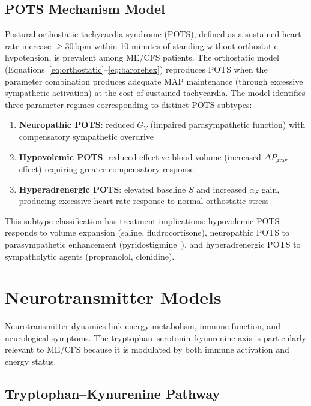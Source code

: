 \subsection{POTS Mechanism Model}
\label{sec:pots-model}

Postural orthostatic tachycardia syndrome (POTS), defined as a sustained heart rate increase $\geq 30$\,bpm within 10 minutes of standing without orthostatic hypotension, is prevalent among ME/CFS patients. The orthostatic model (Equations~\ref{eq:orthostatic}--\ref{eq:baroreflex}) reproduces POTS when the parameter combination produces adequate MAP maintenance (through excessive sympathetic activation) at the cost of sustained tachycardia. The model identifies three parameter regimes corresponding to distinct POTS subtypes:

\begin{enumerate}
    \item \textbf{Neuropathic POTS}: reduced $G_V$ (impaired parasympathetic function) with compensatory sympathetic overdrive
    \item \textbf{Hypovolemic POTS}: reduced effective blood volume (increased $\Delta P_{\text{grav}}$ effect) requiring greater compensatory response
    \item \textbf{Hyperadrenergic POTS}: elevated baseline $S$ and increased $\alpha_S$ gain, producing excessive heart rate response to normal orthostatic stress
\end{enumerate}

This subtype classification has treatment implications: hypovolemic POTS responds to volume expansion (saline, fludrocortisone), neuropathic POTS to parasympathetic enhancement (pyridostigmine~\cite{Raj2005Pyridostigmine}), and hyperadrenergic POTS to sympatholytic agents (propranolol, clonidine).



\section{Neurotransmitter Models}
\label{sec:neurotransmitter-models}

Neurotransmitter dynamics link energy metabolism, immune function, and neurological symptoms. The tryptophan--serotonin--kynurenine axis is particularly relevant to ME/CFS because it is modulated by both immune activation and energy status.

\subsection{Tryptophan--Kynurenine Pathway}

